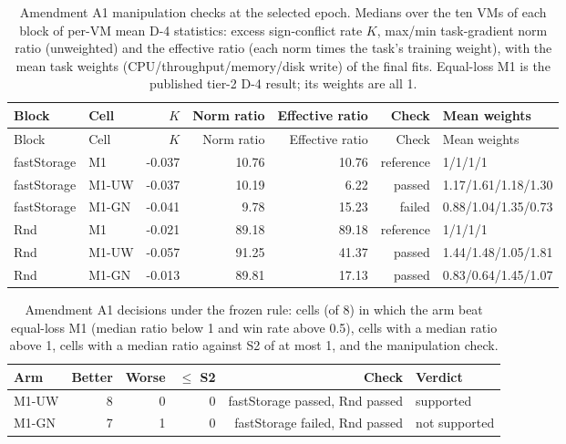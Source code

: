 \begin{longtable}{@{}llrrrrl@{}}
\caption{Amendment A1 manipulation checks at the selected epoch. Medians over the ten VMs of each block of per-VM mean D-4 statistics: excess sign-conflict rate $K$, max/min task-gradient norm ratio (unweighted) and the effective ratio (each norm times the task's training weight), with the mean task weights (CPU/throughput/memory/disk write) of the final fits. Equal-loss M1 is the published tier-2 D-4 result; its weights are all 1.}\label{tab:a1-manipulation}\\
\toprule
Block & Cell & $K$ & Norm ratio & Effective ratio & Check & Mean weights \\
\midrule
\endfirsthead
\toprule
Block & Cell & $K$ & Norm ratio & Effective ratio & Check & Mean weights \\
\midrule
\endhead
fastStorage & M1 & -0.037 & 10.76 & 10.76 & reference & 1/1/1/1 \\
fastStorage & M1-UW & -0.037 & 10.19 & 6.22 & passed & 1.17/1.61/1.18/1.30 \\
fastStorage & M1-GN & -0.041 & 9.78 & 15.23 & failed & 0.88/1.04/1.35/0.73 \\
Rnd & M1 & -0.021 & 89.18 & 89.18 & reference & 1/1/1/1 \\
Rnd & M1-UW & -0.057 & 91.25 & 41.37 & passed & 1.44/1.48/1.05/1.81 \\
Rnd & M1-GN & -0.013 & 89.81 & 17.13 & passed & 0.83/0.64/1.45/1.07 \\
\bottomrule
\end{longtable}

\begin{longtable}{@{}lrrrrl@{}}
\caption{Amendment A1 decisions under the frozen rule: cells (of 8) in which the arm beat equal-loss M1 (median ratio below 1 and win rate above 0.5), cells with a median ratio above 1, cells with a median ratio against S2 of at most 1, and the manipulation check.}\label{tab:a1-decision}\\
\toprule
Arm & Better & Worse & $\le$ S2 & Check & Verdict \\
\midrule
\endhead
M1-UW & 8 & 0 & 0 & fastStorage passed, Rnd passed & supported \\
M1-GN & 7 & 1 & 0 & fastStorage failed, Rnd passed & not supported \\
\bottomrule
\end{longtable}
